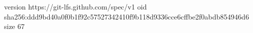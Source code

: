 version https://git-lfs.github.com/spec/v1
oid sha256:ddd9bd40a0f0b1f92c57527342410f9b118d9336cce6cffbe2f0abdb854946d6
size 67
